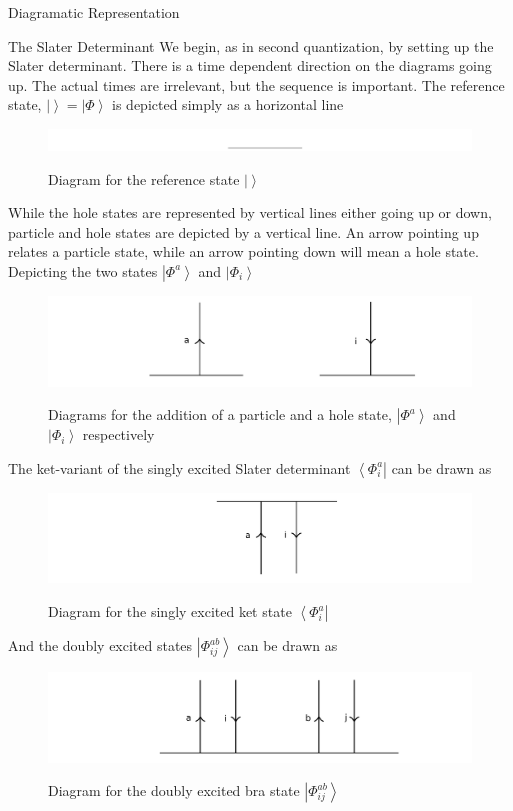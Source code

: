 \documentclass[twoside,english]{uiofysmaster}
\begin{document}
\begin{chapter}{Diagramatic Representation}
	\begin{section}{The Slater Determinant}
		We begin, as in second quantization, by setting up the Slater determinant. There is a time dependent direction on the diagrams going up. The actual times are irrelevant, but the sequence is important. The reference state, $| \left. \right> = \left| \Phi \right>$ is depicted simply as a horizontal line
		\begin{figure}[H]
			\includegraphics[width=\textwidth]{Figures/SlaterDeterminant1.pdf}
			\label{SlaterDeterminant1}
			\caption{Diagram for the reference state $| \left. \right>$}
		\end{figure}
		While the hole states are represented by vertical lines either going up or down, particle and hole states are depicted by a vertical line. An arrow pointing up relates a particle state, while an arrow pointing down will mean a hole state. Depicting the two states $\left| \Phi^a \right> $ and $\left| \Phi_i \right>$
		\begin{figure}[H]
			\includegraphics[width=\textwidth]{Figures/SlaterDeterminant2.pdf}
			\label{SlaterDeterminant2}
			\caption{Diagrams for the addition of a particle and a hole state, $\left| \Phi^a \right> $ and $\left| \Phi_i \right> $ respectively}
		\end{figure}
		The ket-variant of the singly excited Slater determinant $\left< \Phi_i^a \right| $ can be drawn as
		\begin{figure}[H]
			\includegraphics[width=\textwidth]{Figures/SlaterDeterminant3.pdf}
			\label{SlaterDeterminant3}
			\caption{Diagram for the singly excited ket state $\left< \Phi_i^a \right|$}
		\end{figure}
		And the doubly excited states $\left| \Phi_{ij}^{ab} \right>$ can be drawn as
		\begin{figure}[H]
			\includegraphics[width=\textwidth]{Figures/SlaterDeterminant4.pdf}
			\label{SlaterDeterminant4}
			\caption{Diagram for the doubly excited bra state $\left| \Phi_{ij}^{ab} \right>$}
		\end{figure}
	\end{section}


\end{chapter}
\end{document}
